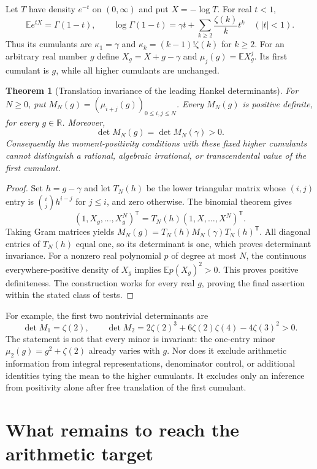 \documentclass[11pt,a4paper]{article}
\newtheorem{theorem}{Theorem}[section]
\theoremstyle{definition}
\theoremstyle{remark}
\newcommand{\R}{\mathbb R}
\numberwithin{equation}{section}
\begin{document}
Let $T$ have density $e^{-t}$ on $(0,\infty)$ and put $X=-\log T$.
For real $t<1$,
\[
 \mathbb E e^{tX}=\Gamma(1-t),\qquad
 \log\Gamma(1-t)=\gamma t+\sum_{k\ge2}\frac{\zeta(k)}k t^k
 \quad(|t|<1).
\]
Thus its cumulants are $\kappa_1=\gamma$ and
$\kappa_k=(k-1)!\zeta(k)$ for $k\ge2$.
For an arbitrary real number $g$ define $X_g=X+g-\gamma$ and
$\mu_j(g)=\mathbb E X_g^j$. Its first cumulant is $g$, while all
higher cumulants are unchanged.

\begin{theorem}[Translation invariance of the leading Hankel determinants]
For $N\ge0$, put $M_N(g)=(\mu_{i+j}(g))_{0\le i,j\le N}$.
Every $M_N(g)$ is positive definite, for every $g\in\R$. Moreover,
\[
 \det M_N(g)=\det M_N(\gamma)>0.
\]
Consequently the moment-positivity conditions with these fixed higher
cumulants cannot distinguish a rational, algebraic irrational, or
transcendental value of the first cumulant.
\end{theorem}
\begin{proof}
Set $h=g-\gamma$ and let $T_N(h)$ be the lower triangular matrix
whose $(i,j)$ entry is $\binom ijh^{i-j}$ for $j\le i$, and zero otherwise.
The binomial theorem gives
\[
 (1,X_g,\ldots,X_g^N)^{\mathsf T}
 =T_N(h)(1,X,\ldots,X^N)^{\mathsf T}.
\]
Taking Gram matrices yields
$M_N(g)=T_N(h)M_N(\gamma)T_N(h)^{\mathsf T}$.
All diagonal entries of $T_N(h)$ equal one, so its determinant is one,
which proves determinant invariance. For a nonzero real polynomial $p$
of degree at most $N$, the continuous everywhere-positive density of
$X_g$ implies $\mathbb E p(X_g)^2>0$. This proves positive definiteness.
The construction works for every real $g$, proving the final assertion
within the stated class of tests.
\end{proof}

For example, the first two nontrivial determinants are
\[
 \det M_1=\zeta(2),\qquad
 \det M_2=2\zeta(2)^3+6\zeta(2)\zeta(4)-4\zeta(3)^2>0.
\]
The statement is not that every minor is invariant: the one-entry minor
$\mu_2(g)=g^2+\zeta(2)$ already varies with $g$. Nor does it exclude
arithmetic information from integral representations, denominator
control, or additional identities tying the mean to the higher
cumulants. It excludes only an inference from positivity alone after
free translation of the first cumulant.


\section{What remains to reach the arithmetic target}
\end{document}
